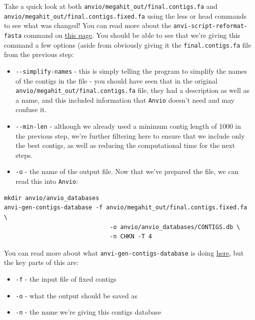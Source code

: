 \documentclass[
]{book}
\providecommand{\tightlist}{%
  \setlength{\itemsep}{0pt}\setlength{\parskip}{0pt}}
\begin{document}
Take a quick look at both \texttt{anvio/megahit\_out/final.contigs.fa} and \texttt{anvio/megahit\_out/final.contigs.fixed.fa} using the less or head commands to see what was changed! You can read more about the \texttt{anvi-script-reformat-fasta} command on \href{https://anvio.org/help/main/programs/anvi-script-reformat-fasta/}{this page}. You should be able to see that we're giving this command a few options (aside from obviously giving it the \texttt{final.contigs.fa} file from the previous step:

\begin{itemize}
\tightlist
\item
  \texttt{-\/-simplify-names} - this is simply telling the program to simplify the names of the contigs in the file - you should have seen that in the original \texttt{anvio/megahit\_out/final.contigs.fa} file, they had a description as well as a name, and this included information that \texttt{Anvi\textquotesingle{}o} doesn't need and may confuse it.
\item
  \texttt{-\/-min-len} - although we already used a minimum contig length of 1000 in the previous step, we're further filtering here to ensure that we include only the best contigs, as well as reducing the computational time for the next steps.
\item
  \texttt{-o} - the name of the output file.
  Now that we've prepared the file, we can read this into \texttt{Anvi\textquotesingle{}o}:
\end{itemize}

\begin{verbatim}
mkdir anvio/anvio_databases
anvi-gen-contigs-database -f anvio/megahit_out/final.contigs.fixed.fa \
                              -o anvio/anvio_databases/CONTIGS.db \
                              -n CHKN -T 4
\end{verbatim}

You can read more about what \texttt{anvi-gen-contigs-database} is doing \href{https://anvio.org/help/main/programs/anvi-gen-contigs-database/}{here}, but the key parts of this are:

\begin{itemize}
\tightlist
\item
  \texttt{-f} - the input file of fixed contigs
\item
  \texttt{-o} - what the output should be saved as
\item
  \texttt{-n} - the name we're giving this contigs database
\end{itemize}
\end{document}
